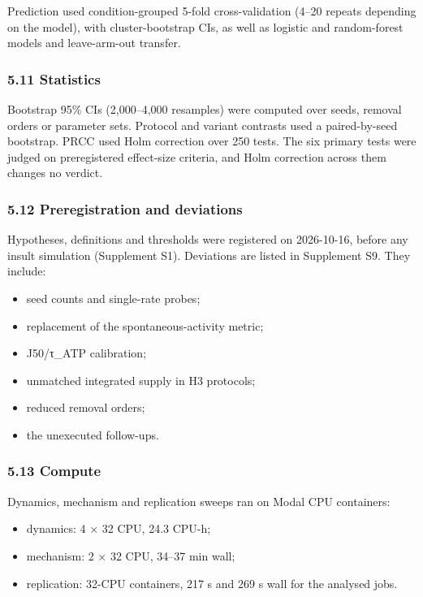 \documentclass[11pt]{article}
\providecommand{\tightlist}{\setlength{\itemsep}{0pt}\setlength{\parskip}{0pt}}
\begin{document}
Prediction used condition-grouped 5-fold cross-validation (4--20 repeats depending on the model), with cluster-bootstrap CIs, as well as logistic and random-forest models and leave-arm-out transfer.

\subsubsection{5.11 Statistics}\label{statistics}

Bootstrap 95\% CIs (2,000--4,000 resamples) were computed over seeds, removal orders or parameter sets. Protocol and variant contrasts used a paired-by-seed bootstrap. PRCC used Holm correction over 250 tests. The six primary tests were judged on preregistered effect-size criteria, and Holm correction across them changes no verdict.

\subsubsection{5.12 Preregistration and deviations}\label{preregistration-and-deviations}

Hypotheses, definitions and thresholds were registered on 2026-10-16, before any insult simulation (Supplement S1). Deviations are listed in Supplement S9. They include:

\begin{itemize}
\tightlist
\item
  seed counts and single-rate probes;
\item
  replacement of the spontaneous-activity metric;
\item
  J50/τ\_ATP calibration;
\item
  unmatched integrated supply in H3 protocols;
\item
  reduced removal orders;
\item
  the unexecuted follow-ups.
\end{itemize}

\subsubsection{5.13 Compute}\label{compute}

Dynamics, mechanism and replication sweeps ran on Modal CPU containers:

\begin{itemize}
\tightlist
\item
  dynamics: 4 × 32 CPU, 24.3 CPU-h;
\item
  mechanism: 2 × 32 CPU, 34--37 min wall;
\item
  replication: 32-CPU containers, 217 s and 269 s wall for the analysed jobs.
\end{itemize}
\end{document}
